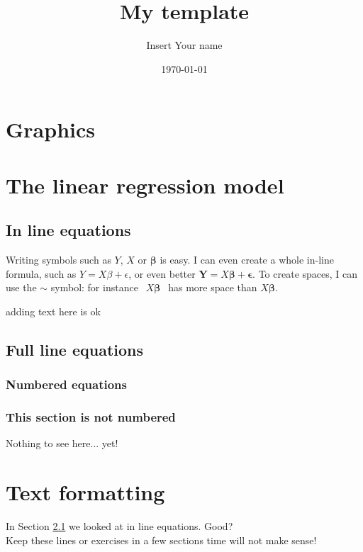 \documentclass[11pt]{article}
\title{My template}
\author{Insert Your name}
\date{\today}
\begin{document}
\maketitle
\section{Graphics}
\section{The linear regression model}
\subsection{In line equations}
\label{sect.myfirst}
Writing symbols such as $Y$, $X$ or $\boldsymbol{\beta}$ is easy. I can
even create a whole in-line formula, such as $Y=X\beta+\epsilon$, or even better
$\textbf{Y}=X\boldsymbol{\beta}+\boldsymbol{\epsilon}$. To create spaces,
I can use the $\sim$ symbol: for instance $~~X\boldsymbol\beta~~$ has more
space than $X\boldsymbol\beta$.

adding text here is ok

\subsection{Full line equations}
\subsubsection{Numbered equations}
\subsubsection*{This section is not numbered}
Nothing to see here... yet!
\section{Text formatting}
In Section \ref{sect.myfirst} we looked at in line equations.
Good?\\ Keep these lines or exercises in a few
sections time will not make sense!
\end{document}
